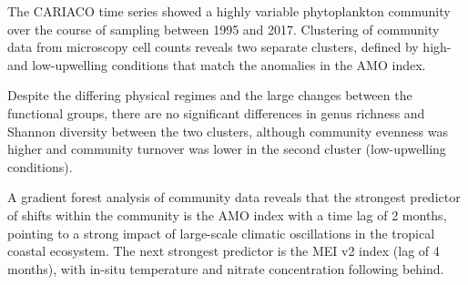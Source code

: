 \documentclass[draft]{agujournal2019}
\begin{document}






\begin{keypoints}
\item The CARIACO time series showed a highly variable phytoplankton community over the course of sampling between 1995 and 2017. Clustering of community data from microscopy cell counts reveals two separate clusters, defined by high- and low-upwelling conditions that match the anomalies in the AMO index. 
\item Despite the differing physical regimes and the large changes between the functional groups, there are no significant differences in genus richness and Shannon diversity between the two clusters, although community evenness was higher and community turnover was lower in the second cluster (low-upwelling conditions).
\item A gradient forest analysis of community data reveals that the strongest predictor of shifts within the community is the AMO index with a time lag of 2 months, pointing to a strong impact of large-scale climatic oscillations in the tropical coastal ecosystem. The next strongest predictor is the MEI v2 index (lag of 4 months), with in-situ temperature and nitrate concentration following behind. 
\end{keypoints}
\end{document}
